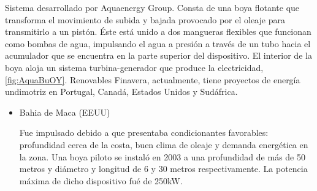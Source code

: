 \begin{itemize}
  Sistema desarrollado por Aquaenergy Group. Consta de una boya flotante
  que transforma el movimiento de subida y bajada provocado por el
  oleaje para transmitirlo a un pistón. Éste está unido a dos mangueras
  flexibles que funcionan como bombas de agua, impulsando el agua a
  presión a través de un tubo hacia el acumulador que se encuentra en la
  parte superior del dispositivo. El interior de la boya aloja un
  sistema turbina-generador que produce la electricidad, \autoref{fig:AquaBuOY}. Renovables
  Finavera, actualmente, tiene proyectos de energía undimotriz en
  Portugal, Canadá, Estados Unidos y Sudáfrica.



  \begin{itemize}
  \item
    Bahia de Maca (EEUU)

    Fue impulsado debido a que presentaba condicionantes favorables:
    profundidad cerca de la costa, buen clima de oleaje y demanda
    energética en la zona. Una boya piloto se instaló en 2003 a una
    profundidad de más de 50 metros y diámetro y longitud de 6 y 30
    metros respectivamente. La potencia máxima de dicho dispositivo fué
    de 250kW.
  \end{itemize}
\end{itemize}

